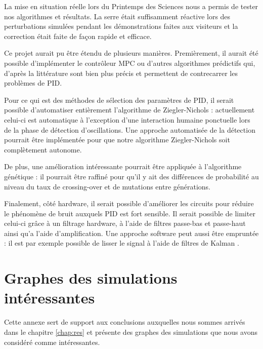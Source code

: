 \documentclass[a4paper,10pt]{report}
\begin{document}
La mise en situation réelle lors du Printemps des Sciences nous a permis de tester nos algorithmes et résultats. La serre était suffisamment réactive lors des perturbations simulées pendant les démonstrations faites aux visiteurs et la correction était faite de façon rapide et efficace.

Ce projet aurait pu être étendu de plusieurs manières. Premièrement, il aurait été possible d'implémenter le contrôleur MPC ou d'autres algorithmes prédictifs qui, d'après la littérature sont bien plus précis et permettent de contrecarrer les problèmes de PID.

Pour ce qui est des méthodes de sélection des paramètres de PID, il serait possible d'automatiser entièrement l'algorithme de Ziegler-Nichols : actuellement celui-ci est automatique à l'exception d'une interaction humaine ponctuelle lors de la phase de détection d'oscillations. Une approche automatisée de la détection pourrait être implémentée pour que notre algorithme Ziegler-Nichols soit complètement autonome.

De plus, une amélioration intéressante pourrait être appliquée à l'algorithme génétique : il pourrait être raffiné pour qu'il y ait des différences de probabilité au niveau du taux de crossing-over et de mutations entre générations.

Finalement, côté hardware, il serait possible d'améliorer les circuits pour réduire le phénomène de bruit auxquels PID est fort sensible. Il serait possible de limiter celui-ci grâce à un filtrage hardware, à l'aide de filtres passe-bas et passe-haut ainsi qu'a l'aide d'amplification. Une approche software peut aussi être empruntée : il est par exemple possible de lisser le signal à l'aide de filtres de Kalman \cite{kalman1960new}.






\appendix

\chapter{Graphes des simulations intéressantes}


Cette annexe sert de support aux conclusions auxquelles nous sommes arrivés dans le chapitre \ref{chap:res} et présente des graphes des simulations que nous avons considéré comme intéressantes.
\end{document}
